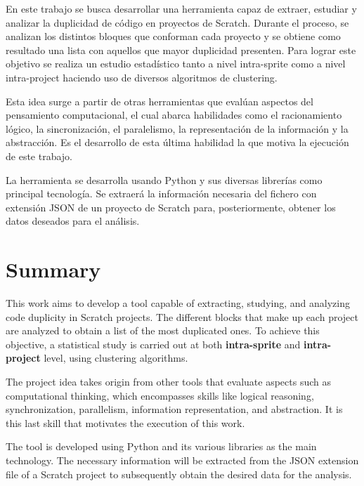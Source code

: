 \documentclass[a4paper, 12pt]{book}
\begin{document}
En este trabajo se busca desarrollar una herramienta capaz de extraer, estudiar y analizar la duplicidad de código en proyectos de Scratch. Durante el proceso, se analizan los distintos bloques que conforman cada proyecto y se obtiene como resultado una lista con aquellos que mayor duplicidad presenten. Para lograr este objetivo se realiza un estudio estadístico tanto a nivel intra-sprite como a nivel intra-project haciendo uso de diversos algoritmos de clustering.

Esta idea surge a partir de otras herramientas que evalúan aspectos del pensamiento computacional, el cual abarca habilidades como el racionamiento lógico, la sincronización, el paralelismo, la representación de la información y la abstracción. Es el desarrollo de esta última habilidad la que motiva la ejecución de este trabajo.

La herramienta se desarrolla usando Python y sus diversas librerías como principal tecnología. Se extraerá la información necesaria del fichero con extensión JSON de un proyecto de Scratch para, posteriormente, obtener los datos deseados para el análisis.


\chapter*{Summary}

This work aims to develop a tool capable of extracting, studying, and analyzing code duplicity in Scratch projects. The different blocks that make up each project are analyzed to obtain a list of the most duplicated ones. To achieve this objective, a statistical study is carried out at both \textbf{intra-sprite} and \textbf{intra-project} level, using clustering algorithms.

The project idea takes origin from other tools that evaluate aspects such as computational thinking, which encompasses skills like logical reasoning, synchronization, parallelism, information representation, and abstraction. It is this last skill that motivates the execution of this work.

The tool is developed using Python and its various libraries as the main technology. The necessary information will be extracted from the JSON extension file of a Scratch project to subsequently obtain the desired data for the analysis.
\end{document}
